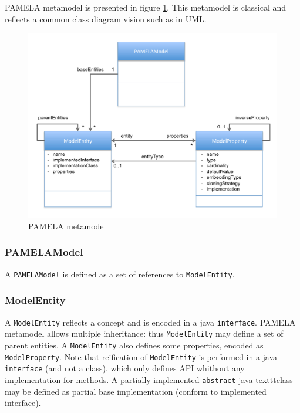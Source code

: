 PAMELA metamodel is presented in figure \ref{fig:PamelaMetaModel}.
This metamodel is classical and reflects a common class diagram vision such as in UML. 

\begin{figure}
    \centering
    \includegraphics[width=1.0 \columnwidth]{PamelaMetaModel.pdf}
    \caption{PAMELA metamodel}
    \label{fig:PamelaMetaModel}
\end{figure}

\subsubsection{PAMELAModel}

A \texttt{PAMELAModel} is defined as a set of references to \texttt{ModelEntity}. 

\subsubsection{ModelEntity}

A \texttt{ModelEntity} reflects a concept and is encoded in a java \texttt{interface}. PAMELA metamodel allows multiple inheritance: thus \texttt{ModelEntity} may define a set of parent entities. A \texttt{ModelEntity} also defines some properties, encoded as \texttt{ModelProperty}. Note that reification of \texttt{ModelEntity} is performed in a java \texttt{interface} (and not a class), which only defines API whithout any implementation for methods. A partially implemented \texttt{abstract} java texttt{class} may be defined as partial base implementation (conform to implemented interface).

